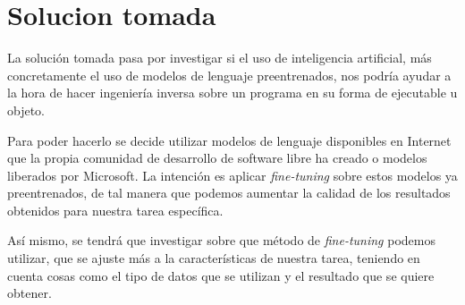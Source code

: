 \section{Solucion tomada}
\label{sec:solucion}


La solución tomada pasa por investigar si el uso de inteligencia artificial, más concretamente el uso de modelos de lenguaje preentrenados, nos podría ayudar a la hora de hacer
ingeniería inversa sobre un programa en su forma de ejecutable u objeto.

Para poder hacerlo se decide utilizar modelos de lenguaje disponibles en Internet que la propia comunidad de desarrollo de software libre ha creado o modelos liberados por Microsoft.
La intención es aplicar \textit{fine-tuning} sobre estos modelos ya preentrenados, de tal manera que podemos aumentar la calidad de los resultados obtenidos para nuestra
tarea específica.

Así mismo, se tendrá que investigar sobre que método de \textit{fine-tuning} podemos utilizar, que se ajuste más a la características de nuestra tarea, teniendo en cuenta cosas como el
tipo de datos que se utilizan y el resultado que se quiere obtener.
